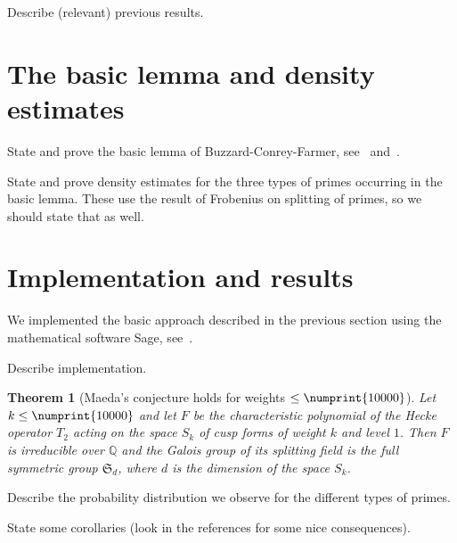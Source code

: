 \documentclass[11pt]{article}
\theoremstyle{plain}
\newtheorem{theorem}{Theorem}[section]
\theoremstyle{definition}
\theoremstyle{remark}
\numberwithin{equation}{section}
\numberwithin{table}{section}
\newcommand{\QQ}{\mathbb{Q}}
\renewcommand{\SS}{\mathfrak{S}}
\newcommand{\bound}{\numprint{10000}}
\begin{document}
Describe (relevant) previous results.

\section{The basic lemma and density estimates}

State and prove the basic lemma of Buzzard-Conrey-Farmer,
see~\cite{Buzzard} and~\cite[Lemma~4]{ConreyFarmer}.

State and prove density estimates for the three types of primes
occurring in the basic lemma.  These use the result of Frobenius on
splitting of primes, so we should state that as well.

\section{Implementation and results}
We implemented the basic approach described in the previous section
using the mathematical software Sage, see~\cite{Sage}.

Describe implementation.

\begin{theorem}[Maeda's conjecture holds for weights $\leq \bound$]
  Let $k\leq \bound$ and let $F$ be the characteristic polynomial of the
  Hecke operator $T_2$ acting on the space $S_k$ of cusp forms of weight
  $k$ and level $1$.  Then $F$ is irreducible over $\QQ$ and the Galois
  group of its splitting field is the full symmetric group $\SS_d$, 
  where $d$ is the dimension of the space $S_k$.
\end{theorem}


Describe the probability distribution we observe for the different types
of primes.

State some corollaries (look in the references for some nice
consequences).


\printbibliography
\end{document}
